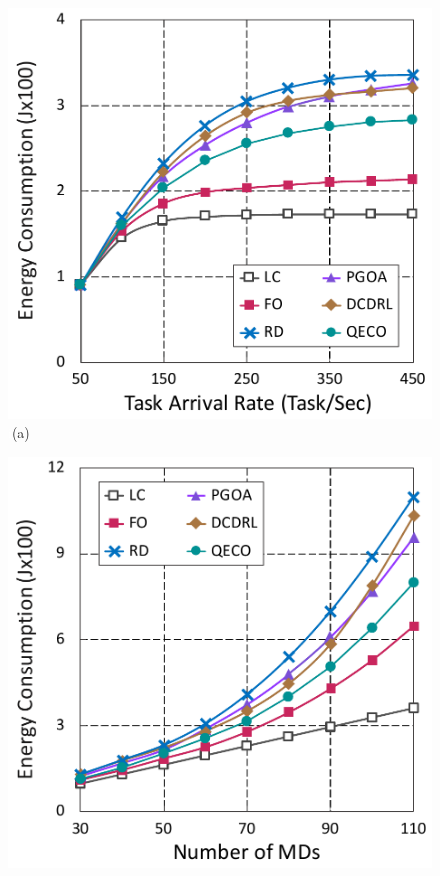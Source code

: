 \documentclass[10pt, journal,letterpaper]{IEEEtran}
\begin{document}
\begin{figure}[tbp]
	\captionsetup{name=Fig.}
	\begin{minipage}[b]{0.50\linewidth}
		\centering
		\includegraphics[width=\textwidth]{ energy_1} 		
		\textcolor{white}{i}\hspace{0.6cm}(a)
	\end{minipage}
	\hspace{-0.2cm}
	\begin{minipage}[b]{0.50\linewidth}
		\centering
		\includegraphics[width=\textwidth]{ energy_2}

\end{minipage}
\end{figure}
\end{document}
